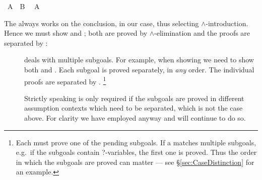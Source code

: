 \begin{isabellebody}
\ {\isachardoublequoteopen}A\ {\isasymand}\ B{\isachardoublequoteclose}\ \isamarkupfalse%
\ {\isachardoublequoteopen}A{\isachardoublequoteclose}\ \isacommand{{\isachardot}{\isachardot}}\isamarkupfalse%
\isanewline
{}\isamarkupfalse%
%
\endisatagproof
{\isafoldproof}%
%
\isadelimproof
%
\endisadelimproof
%
\begin{isamarkuptext}%
\noindent The  always works on the conclusion,
 in our case, thus selecting $\land$-introduction. Hence
we must show  and ; both are proved by
$\land$-elimination and the proofs are separated by :
\begin{description}
\item[] deals with multiple subgoals. For example,
when showing  we need to show both  and .  Each subgoal is proved separately, in \emph{any} order. The
individual proofs are separated by .  \footnote{Each
 must prove one of the pending subgoals.  If a
 matches multiple subgoals, e.g.\ if the subgoals
contain ?-variables, the first one is proved. Thus the order in which
the subgoals are proved can matter --- see
\S\ref{sec:CaseDistinction} for an example.}

Strictly speaking  is only required if the subgoals
are proved in different assumption contexts which need to be
separated, which is not the case above. For clarity we
have employed  anyway and will continue to do so.
\end{description}


\end{isamarkuptext}
\end{isabellebody}
